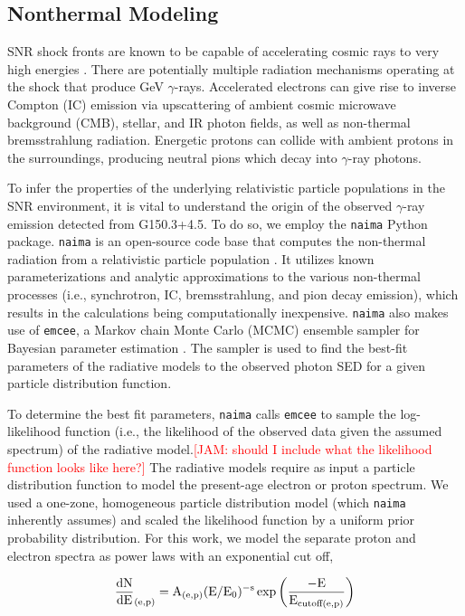 \documentclass[iop]{emulateapj}
\newcommand{\kibitz}[2]{\ifnum\Comments=1\textcolor{#1}{#2}\fi}
\newcommand{\jamie}[1]{\kibitz{red}      {[JAM: #1]}}
\newcommand{\gam}{$\gamma$-ray}
\newcommand{\nai}{{\tt naima}}
\newcommand{\emc}{{\tt emcee}}
\newcommand{\Gone}{G150.3+4.5}
\begin{document}
\subsection{Nonthermal Modeling}\label{G150:naima}


SNR shock fronts are known to be capable of accelerating cosmic rays to very high energies \citep{W44pion,Koyama95}. There are potentially multiple radiation mechanisms operating at the shock that produce GeV \gam{}s. Accelerated electrons can give rise to inverse Compton (IC) emission via upscattering of ambient cosmic microwave background (CMB), stellar, and IR photon fields, as well as non-thermal bremsstrahlung radiation. Energetic protons can collide with ambient protons in the surroundings, producing neutral pions which decay into \gam{} photons. 

To infer the properties of the underlying relativistic particle populations in the SNR environment, it is vital to understand the origin of the observed \gam{} emission detected from  \Gone{}. To do so, we employ the \nai{} Python package. \nai{} is an open-source code base that computes the non-thermal radiation from a relativistic particle population \citep{Zabalza15}. It utilizes known parameterizations and analytic approximations to the various non-thermal processes (i.e., synchrotron, IC, bremsstrahlung, and pion decay emission), which results in the calculations being computationally inexpensive. \nai{} also makes use of \emc{}, a Markov chain Monte Carlo (MCMC) ensemble sampler for Bayesian parameter estimation \citep{Foreman13}. The sampler is used to find the best-fit parameters of the radiative models to the observed photon SED for a given particle distribution function. 

To determine the best fit parameters, \nai{} calls \emc{} to sample the log-likelihood function (i.e., the likelihood of the observed data given the assumed spectrum) of the radiative model.\jamie{should I include what the likelihood function looks like here?} The radiative models require as input a particle distribution function to model the present-age electron or  proton spectrum. We used a one-zone, homogeneous particle distribution model (which \nai{} inherently assumes) and scaled the likelihood function by a uniform prior probability distribution. For this work, we model the separate proton and electron spectra as power laws with an exponential cut off,

\begin{equation}\label{eq:ecpl}
	{\rm \frac{dN}{dE}_{(e,p)} = A_{(e,p)} (E / E_0) ^{-s} \exp {\bigg ( }\frac{- E}{ E_{cutoff(e,p)}}{\bigg)}}
\end{equation}
\end{document}
